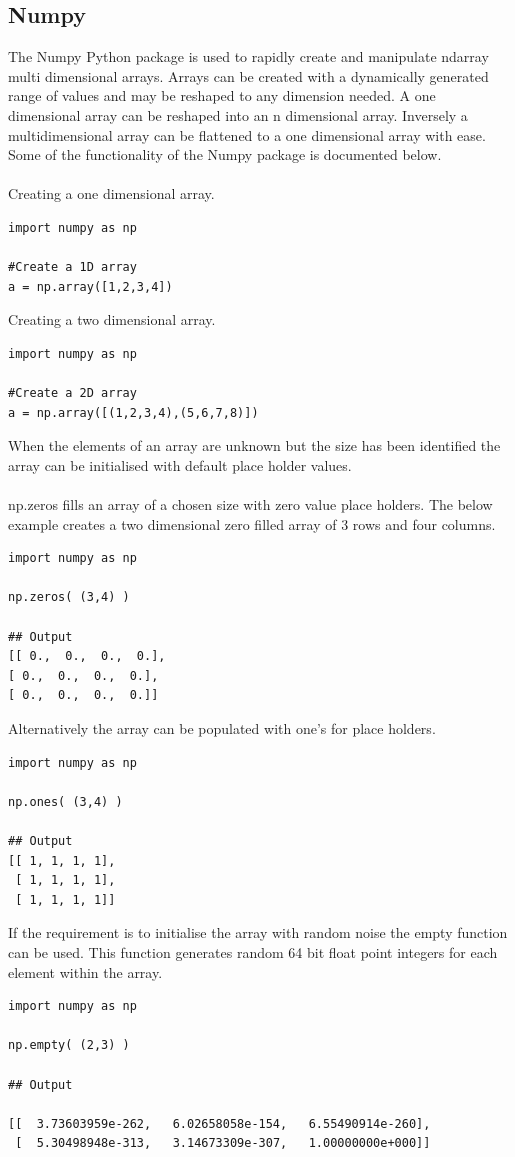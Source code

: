 \subsection{Numpy}
The Numpy Python package is used to rapidly create and manipulate ndarray multi dimensional arrays. Arrays can be created with a dynamically generated range of values and may be reshaped to any dimension needed. A one dimensional array can be reshaped into an n dimensional array. Inversely a multidimensional array can be flattened to a one dimensional array with ease. Some of the functionality of the Numpy package is documented below.~\cite{Quicksta66:online}\\\\
Creating a one dimensional array.
\begin{verbatim}
import numpy as np

#Create a 1D array
a = np.array([1,2,3,4])
\end{verbatim} 
 Creating a two dimensional array.
\begin{verbatim}
import numpy as np
 
#Create a 2D array
a = np.array([(1,2,3,4),(5,6,7,8)])
\end{verbatim}
When the elements of an array are unknown but the size has been identified the array can be initialised with default place holder values.\\\\
np.zeros fills an array of a chosen size with zero value place holders.
The below example creates a two dimensional zero filled array of 3 rows and four columns.
\begin{verbatim}
import numpy as np
 
np.zeros( (3,4) )
 
## Output
[[ 0.,  0.,  0.,  0.],
[ 0.,  0.,  0.,  0.],
[ 0.,  0.,  0.,  0.]]
\end{verbatim}
Alternatively the array can be populated with one's for place holders.
\begin{verbatim}
import numpy as np
 
np.ones( (3,4) )
 
## Output
[[ 1, 1, 1, 1],
 [ 1, 1, 1, 1],
 [ 1, 1, 1, 1]]
\end{verbatim}
If the requirement is to initialise the array with random noise the empty function can be used. This function generates random 64 bit float point integers for each element within the array.
\begin{verbatim}
import numpy as np
 
np.empty( (2,3) )
 
## Output
                                 
[[  3.73603959e-262,   6.02658058e-154,   6.55490914e-260],
 [  5.30498948e-313,   3.14673309e-307,   1.00000000e+000]]
\end{verbatim}
